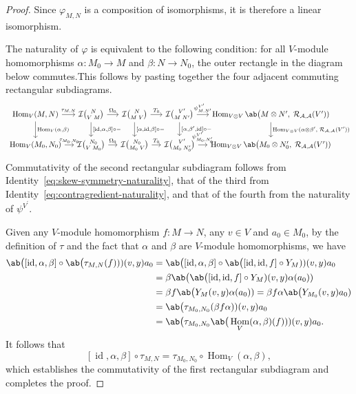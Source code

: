 \documentclass[12pt, english]{article}
\numberwithin{equation}{section}
\DeclareMathOperator{\Hom}{Hom}
\DeclareMathOperator{\id}{id}
\theoremstyle{plain}
\theoremstyle{definition}
\theoremstyle{remark}
\begin{document}
	\begin{proof}
		
		Since $\varphi_{M, N}$ is a composition of isomorphisms, it is therefore a linear isomorphism.
		
		The naturality of $\varphi$  is equivalent to the following condition:   for all $V$-module homomorphisms $\alpha\colon M_0 \to M$ and $\beta\colon N \to N_0$,
		the outer rectangle in the diagram below commutes.This follows by pasting together the four adjacent commuting rectangular subdiagrams.
		\[
		\begin{tikzcd}[font=\fontsize{10pt}{11pt}\selectfont, column sep=small]
			\Hom_{V}(M, N) \arrow[r, "{\tau_{M, N}}"] & \mathcal{I}\binom{N}{V\; M} \arrow[r, "\Omega_0"] & \mathcal{I}\binom{N}{M\; V} \arrow[r, "T_0"] & \mathcal{I}\binom{V^\prime}{M\; N^\prime} \arrow[r, "{\psi^{V^\prime}_{M,N^\prime}}"] & \Hom_{V \otimes V} \ab\big(M \otimes N^\prime, \; \mathcal{R}_{\mathcal{A}, \mathcal{A}}(V^\prime)) \\
			\Hom_{V}(M_0, N_0) \arrow[r, "{\tau_{M_0, N_0}}"] & \mathcal{I}\binom{N_0}{V\; M_0} \arrow[r, "\Omega_0"] & \mathcal{I}\binom{N_0}{M_0\; V}  \arrow[r, "T_0"] & \mathcal{I}\binom{V^\prime}{M_0\; N^\prime_0}  \arrow[r, "{\psi^{V^\prime}_{M_0, N_0^\prime}}"] & \Hom_{V \otimes V} \ab\big(M_0 \otimes N_0^\prime, \; \mathcal{R}_{\mathcal{A}, \mathcal{A}}(V^\prime))
			\arrow[from=1-1, to=2-1, "{\Hom_V(\alpha, \beta)}"]
			\arrow[from=1-2, to=2-2, "{[\id, \alpha, \beta] \circ-}"]
			\arrow[from=1-3, to=2-3, "{[\alpha, \id, \beta] \circ-}"]
			\arrow[from=1-4, to=2-4, "{[\alpha, \beta^\prime, \id] \circ-}"]
			\arrow[from=1-5, to=2-5, "{ \Hom_{V \otimes V}(\alpha \otimes \beta^\prime,\; \mathcal{R}_{\mathcal{A}, \mathcal{A}}(V^\prime)) }"]
		\end{tikzcd}
		\]
		Commutativity of the second rectangular subdiagram follows from Identity~\eqref{eq:skew-symmetry-naturality}, that of the third from Identity~\eqref{eq:contragredient-naturality},
		and that of the fourth from the naturality of $\psi^{V^\prime}$.
		
		Given any $V$-module homomorphism $f\colon M \to N$, any $v \in V$ and $a_0 \in M_0$,
		by the definition of $\tau$ and the fact that $\alpha$ and $\beta$ are $V$-module homomorphisms, we have
		\begin{align*}
			\ab\big([\id, \alpha, \beta] \circ \ab\big(\tau_{M, N} (f))) (v, y) a_0
			& = \ab\big([\id, \alpha, \beta] \circ \ab\big([\id, \id, f] \circ Y_M)) (v, y) a_0\\
			& = \beta \ab\big(\ab\big([\id, \id, f] \circ Y_M) (v, y) \alpha(a_0)) \\
			& = \beta f \ab\big(Y_M(v, y) \alpha(a_0)) = \beta f \alpha \ab\big(Y_{M_0}(v, y) a_0) \\
			& = \ab\big(\tau_{M_0, N_0}(\beta f \alpha)) (v, y) a_0 \\
			& = \ab\big(\tau_{M_0, N_0} \ab\big(\Hom_V(\alpha, \beta) (f))) (v, y) a_0.
		\end{align*}
		It follows that
		\[
		[\id, \alpha, \beta] \circ \tau_{M, N} = \tau_{M_0, N_0} \circ \Hom_V(\alpha, \beta),
		\]
		which establishes the commutativity of the first rectangular subdiagram and completes the proof.
		

\end{proof}
\end{document}
